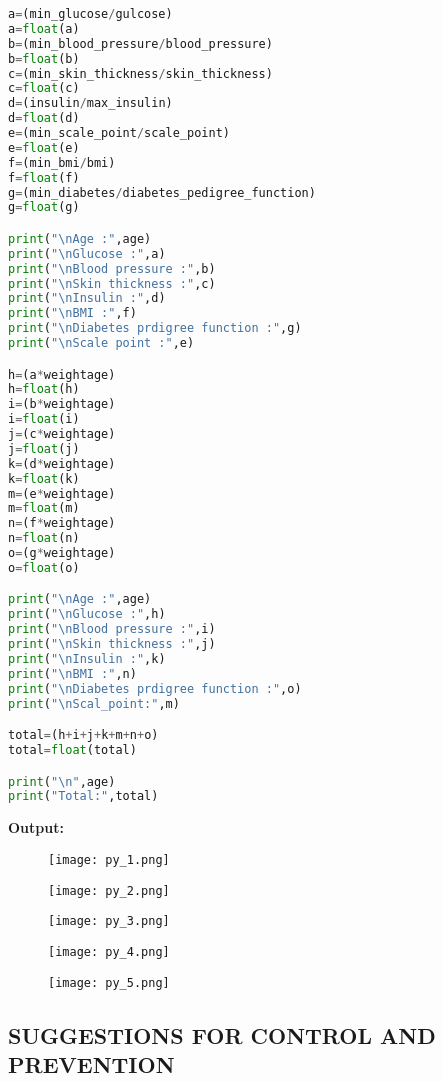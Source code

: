 \documentclass[12pt,a4paper]{article}
\begin{document}
\begin{lstlisting}[language= Python]
a=(min_glucose/gulcose)
a=float(a)
b=(min_blood_pressure/blood_pressure)
b=float(b)
c=(min_skin_thickness/skin_thickness)
c=float(c)
d=(insulin/max_insulin)
d=float(d)
e=(min_scale_point/scale_point)
e=float(e)
f=(min_bmi/bmi)
f=float(f)
g=(min_diabetes/diabetes_pedigree_function)
g=float(g)

print("\nAge :",age)
print("\nGlucose :",a)
print("\nBlood pressure :",b)
print("\nSkin thickness :",c)
print("\nInsulin :",d)
print("\nBMI :",f)
print("\nDiabetes prdigree function :",g)
print("\nScale point :",e)

h=(a*weightage)
h=float(h)
i=(b*weightage)
i=float(i)
j=(c*weightage)
j=float(j)
k=(d*weightage)
k=float(k)
m=(e*weightage)
m=float(m)
n=(f*weightage)
n=float(n)
o=(g*weightage)
o=float(o)

print("\nAge :",age)
print("\nGlucose :",h)
print("\nBlood pressure :",i)
print("\nSkin thickness :",j)
print("\nInsulin :",k)
print("\nBMI :",n)
print("\nDiabetes prdigree function :",o)
print("\nScal_point:",m)

total=(h+i+j+k+m+n+o)
total=float(total)

print("\n",age)
print("Total:",total)
\end{lstlisting}
\newpage

\textbf{Output:}

\begin{figure}[h!]
    \centering
    \texttt{[image: py\_1.png]}
    \caption{}
\end{figure}

\begin{figure}[h!]
    \centering
    \texttt{[image: py\_2.png]}
    \caption{}
\end{figure}

\newpage

\begin{figure}[h!]
    \centering
    \texttt{[image: py\_3.png]}
    \caption{}
\end{figure}

\begin{figure}[h!]
    \centering
    \texttt{[image: py\_4.png]}
    \caption{}
\end{figure}

\begin{figure}[h!]
    \centering
    \texttt{[image: py\_5.png]}
    \caption{}
\end{figure}

\newpage
\subsection{SUGGESTIONS FOR CONTROL AND PREVENTION}
\end{document}
